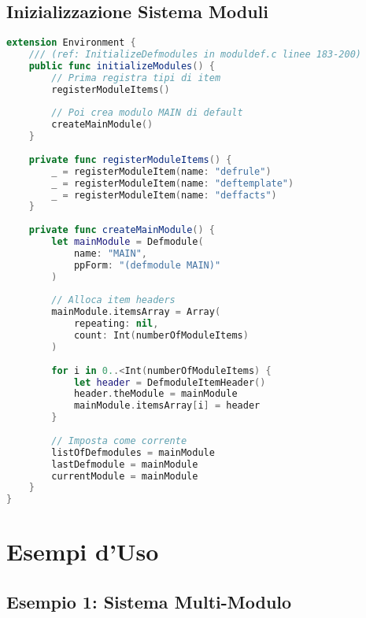 \subsection{Inizializzazione Sistema Moduli}

\begin{lstlisting}[language=Swift]
extension Environment {
    /// (ref: InitializeDefmodules in moduldef.c linee 183-200)
    public func initializeModules() {
        // Prima registra tipi di item
        registerModuleItems()
        
        // Poi crea modulo MAIN di default
        createMainModule()
    }
    
    private func registerModuleItems() {
        _ = registerModuleItem(name: "defrule")
        _ = registerModuleItem(name: "deftemplate")
        _ = registerModuleItem(name: "deffacts")
    }
    
    private func createMainModule() {
        let mainModule = Defmodule(
            name: "MAIN",
            ppForm: "(defmodule MAIN)"
        )
        
        // Alloca item headers
        mainModule.itemsArray = Array(
            repeating: nil,
            count: Int(numberOfModuleItems)
        )
        
        for i in 0..<Int(numberOfModuleItems) {
            let header = DefmoduleItemHeader()
            header.theModule = mainModule
            mainModule.itemsArray[i] = header
        }
        
        // Imposta come corrente
        listOfDefmodules = mainModule
        lastDefmodule = mainModule
        currentModule = mainModule
    }
}
\end{lstlisting}

\section{Esempi d'Uso}

\subsection{Esempio 1: Sistema Multi-Modulo}

